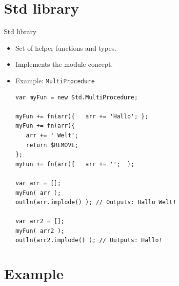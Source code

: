 \documentclass[ucs,9pt]{beamer}
\begin{document}
\section{Std library}
\begin{frame}[fragile]{Std library}
	\begin{itemize}
		\item Set of helper functions and types.
		\item Implements the module concept.
		\item Example: \lstinline!MultiProcedure!
		\begin{lstlisting}
var myFun = new Std.MultiProcedure;

myFun += fn(arr){	arr += 'Hallo'; };
myFun += fn(arr){	
   arr += ' Welt'; 
   return $REMOVE;
};  
myFun += fn(arr){	arr += '';  };

var arr = [];
myFun( arr );
outln(arr.implode() ); // Outputs: Hallo Welt!

var arr2 = [];
myFun( arr2 );
outln(arr2.implode() ); // Outputs: Hallo!

		\end{lstlisting}
	\end{itemize}
	
\end{frame}
%

\section{Example}


\end{document}
